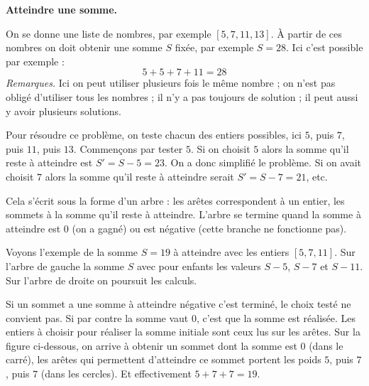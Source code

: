 \documentclass[11pt,class=report,crop=false]{standalone}
\begin{document}

\begin{activite}
	
   


 \textbf{Atteindre une somme.}
  
   On se donne une liste de nombres, par exemple $[5,7,11,13]$. À partir de ces nombres on doit obtenir une somme $S$ fixée, par exemple $S=28$. Ici c'est possible par exemple :
   $$5+5+7+11 = 28$$
   \emph{Remarques.} Ici on peut utiliser plusieurs fois le même nombre ; on n'est pas obligé d'utiliser tous les nombres ; il n'y a pas toujours de solution ; il peut aussi y avoir plusieurs solutions.
   
   Pour résoudre ce problème, on teste chacun des entiers possibles, ici $5$, puis $7$, puis $11$, puis $13$. Commençons par tester $5$. Si on choisit $5$ alors la somme qu'il reste à atteindre est $S' = S-5 = 23$. On a donc simplifié le problème. Si on avait choisit $7$ alors la somme qu'il reste à atteindre serait $S'=S-7=21$, etc.
   
   Cela s'écrit sous la forme d'un arbre : les arêtes correspondent à un entier, les sommets à la somme qu'il reste à atteindre. L'arbre se termine quand la somme à atteindre est $0$ (on a gagné) ou est négative (cette branche ne fonctionne pas).
 
Voyons l'exemple de la somme $S=19$ à atteindre avec les entiers $[5,7,11]$.
Sur l'arbre de gauche la somme $S$ avec pour enfants les valeurs $S-5$, $S-7$ et $S-11$. Sur l'arbre de droite on poursuit les calculs.
      
 \begin{minipage}{0.4\textwidth}   
\end{minipage}
\begin{minipage}{0.59\textwidth}  
\end{minipage} 

\medskip

Si un sommet a une somme à atteindre négative c'est terminé, le choix testé ne convient pas. Si par contre la somme vaut $0$, c'est que la somme est réalisée. Les entiers à choisir pour réaliser la somme initiale sont ceux lus sur les arêtes.
Sur la figure ci-dessous, on arrive à obtenir un sommet dont la somme est $0$ (dans le carré), les arêtes qui permettent d'atteindre ce sommet portent les poids $5$, puis $7$, puis $7$ (dans les cercles). 
Et effectivement $5+7+7=19$.


\end{activite}
\end{document}
